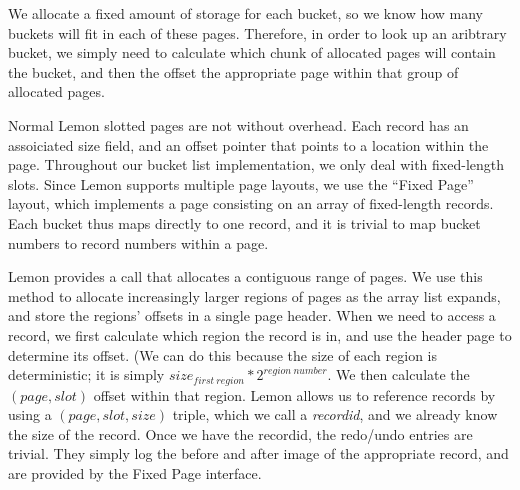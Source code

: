 \documentclass[letterpaper,twocolumn,english]{article}
\newcommand{\yad}{Lemon\xspace}
\newcommand{\eab}[1]{\textcolor{red}{\bf EAB: #1}}
\begin{document}
We allocate a fixed amount of storage for each bucket, so we know how
many buckets will fit in each of these pages.  Therefore, in order to
look up an aribtrary bucket, we simply need to calculate which chunk
of allocated pages will contain the bucket, and then the offset the
appropriate page within that group of allocated pages.  


Normal \yad slotted pages are not without overhead.  Each record has
an assoiciated size field, and an offset pointer that points to a
location within the page.  Throughout our bucket list implementation,
we only deal with fixed-length slots.  Since \yad supports multiple
page layouts, we use the ``Fixed Page'' layout, which implements a
page consisting on an array of fixed-length records.  Each bucket thus
maps directly to one record, and it is trivial to map bucket numbers
to record numbers within a page.  

\yad provides a call that allocates a contiguous range of pages.  We
use this method to allocate increasingly larger regions of pages as
the array list expands, and store the regions' offsets in a single 
page header.  When we need to access a record, we first calculate 
which region the record is in, and use the header page to determine 
its offset.  (We can do this because the size of each region is 
deterministic; it is simply $size_{first~region} * 2^{region~number}$.  
We then calculate the $(page,slot)$ offset within that region.  \yad 
allows us to reference records by using a $(page,slot,size)$ triple, 
which we call a {\em recordid}, and we already know the size of the 
record.  Once we have the recordid, the redo/undo entries are trivial.  
They simply log the before and after image of the appropriate record, 
and are provided by the Fixed Page interface.

%
\end{document}
